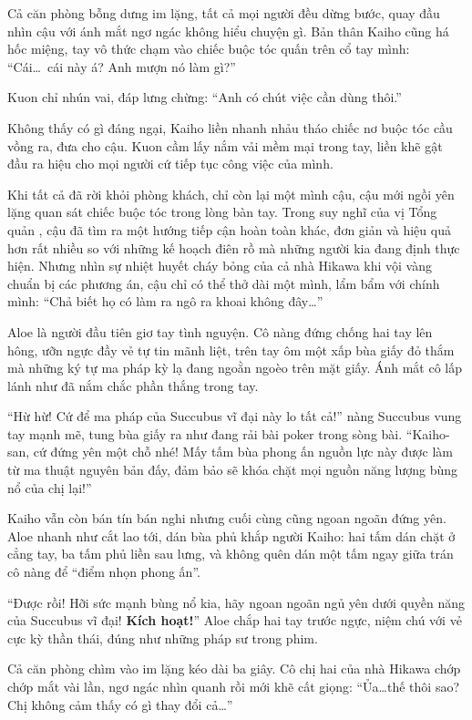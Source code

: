 ﻿\documentclass[../main.tex]{subfiles}
\begin{document}
Cả căn phòng bỗng dưng im lặng, tất cả mọi người đều dừng bước, quay đầu nhìn cậu với ánh mắt ngơ ngác không hiểu chuyện gì. Bản thân Kaiho cũng há hốc miệng, tay vô thức chạm vào chiếc buộc tóc quấn trên cổ tay mình: ``Cái\dots\ cái này á? Anh mượn nó làm gì?''

Kuon chỉ nhún vai, đáp lưng chừng: ``Anh có chút việc cần dùng thôi.''

Không thấy có gì đáng ngại, Kaiho liền nhanh nhảu tháo chiếc nơ buộc tóc cầu vồng ra, đưa cho cậu. Kuon cầm lấy nắm vải mềm mại trong tay, liền khẽ gật đầu ra hiệu cho mọi người cứ tiếp tục công việc của mình. 

Khi tất cả đã rời khỏi phòng khách, chỉ còn lại một mình cậu, cậu mới ngồi yên lặng quan sát chiếc buộc tóc trong lòng bàn tay. Trong suy nghĩ của vị Tổng quản \hll, cậu đã tìm ra một hướng tiếp cận hoàn toàn khác, đơn giản và hiệu quả hơn rất nhiều so với những kế hoạch điên rồ mà những người kia đang định thực hiện. Nhưng nhìn sự nhiệt huyết cháy bỏng của cả nhà Hikawa khi vội vàng chuẩn bị các phương án, cậu chỉ có thể thở dài một mình, lẩm bẩm với chính mình: ``Chả biết họ có làm ra ngô ra khoai không đây\dots''

\ct

Aloe là người đầu tiên giơ tay tình nguyện. Cô nàng đứng chống hai tay lên hông, ưỡn ngực đầy vẻ tự tin mãnh liệt, trên tay ôm một xấp bùa giấy đỏ thắm mà những ký tự ma pháp kỳ lạ đang ngoằn ngoèo trên mặt giấy. Ánh mắt cô lấp lánh như đã nắm chắc phần thắng trong tay.

``Hừ hừ! Cứ để ma pháp của Succubus vĩ đại này lo tất cả!'' nàng Succubus vung tay mạnh mẽ, tung bùa giấy ra như đang rải bài poker trong sòng bài. ``Kaiho-san, cứ đứng yên một chỗ nhé! Mấy tấm bùa phong ấn nguồn lực này được làm từ ma thuật nguyên bản đấy, đảm bảo sẽ khóa chặt mọi nguồn năng lượng bùng nổ của chị lại!''

Kaiho vẫn còn bán tín bán nghi nhưng cuối cùng cũng ngoan ngoãn đứng yên. Aloe nhanh như cắt lao tới, dán bùa phủ khắp người Kaiho: hai tấm dán chặt ở cẳng tay, ba tấm phủ liền sau lưng, và không quên dán một tấm ngay giữa trán cô nàng để ``điểm nhọn phong ấn''.

``Được rồi! Hỡi sức mạnh bùng nổ kia, hãy ngoan ngoãn ngủ yên dưới quyền năng của Succubus vĩ đại! \textbf{Kích hoạt!}'' Aloe chắp hai tay trước ngực, niệm chú với vẻ cực kỳ thần thái, đúng như những pháp sư trong phim.

Cả căn phòng chìm vào im lặng kéo dài ba giây. Cô chị hai của nhà Hikawa chớp chớp mắt vài lần, ngơ ngác nhìn quanh rồi mới khẽ cất giọng: ``Ủa\dots thế thôi sao? Chị không cảm thấy có gì thay đổi cả\dots''
\end{document}
